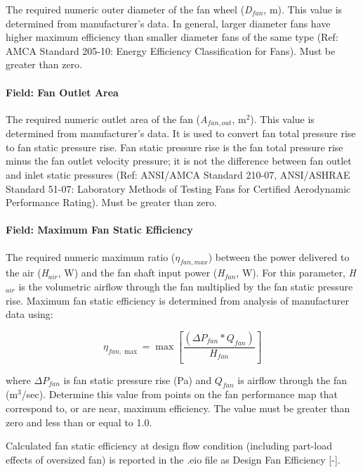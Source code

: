 The required numeric outer diameter of the fan wheel (\emph{D\(_{fan}\)}, m). This value is determined from manufacturer's data. In general, larger diameter fans have higher maximum efficiency than smaller diameter fans of the same type (Ref: AMCA Standard 205-10: Energy Efficiency Classification for Fans). Must be greater than zero.

\paragraph{Field: Fan Outlet Area}\label{field-fan-outlet-area}

The required numeric outlet area of the fan (\emph{A\(_{fan,out}\)}, m\(^{2}\)). This value is determined from manufacturer's data. It is used to convert fan total pressure rise to fan static pressure rise. Fan static pressure rise is the fan total pressure rise minus the fan outlet velocity pressure; it is not the difference between fan outlet and inlet static pressures (Ref: ANSI/AMCA Standard 210-07, ANSI/ASHRAE Standard 51-07: Laboratory Methods of Testing Fans for Certified Aerodynamic Performance Rating). Must be greater than zero.

\paragraph{Field: Maximum Fan Static Efficiency}\label{field-maximum-fan-static-efficiency}

The required numeric maximum ratio (\(\eta_{fan,max}\)) between the power delivered to the air (\emph{H\(_{air}\)}, W) and the fan shaft input power (\emph{H\(_{fan}\)}, W). For this parameter, \emph{H\(_{air}\)} is the volumetric airflow through the fan multiplied by the fan static pressure rise. Maximum fan static efficiency is determined from analysis of manufacturer data using:

\begin{equation}
{\eta_{fan,\max }} = \max \left[ {\frac{{\left( {\Delta {P_{fan}} * {Q_{fan}}} \right)}}{{{H_{fan}}}}} \right]
\end{equation}

where \(\Delta P_{fan}\) is fan static pressure rise (Pa) and \(Q_{fan}\) is airflow through the fan (m\(^{3}\)/sec). Determine this value from points on the fan performance map that correspond to, or are near, maximum efficiency. The value must be greater than zero and less than or equal to 1.0.

Calculated fan static efficiency at design flow condition (including part-load effects of oversized fan) is reported in the .eio file as Design Fan Efficiency {[}-{]}.


